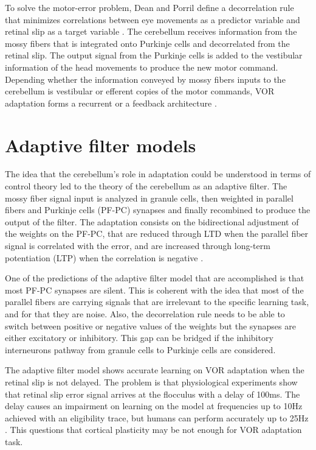 \documentclass[12pt, a4paper,twoside]{tesi_upf}
\begin{document}
\begin{appendices}
To solve the motor-error problem, Dean and Porril define a decorrelation rule that minimizes correlations between eye movements as a predictor variable and retinal slip as a target variable \cite{Dean2002}. The cerebellum receives information from the mossy fibers that is integrated onto Purkinje cells and decorrelated from the retinal slip. The output signal from the Purkinje cells is added to the vestibular information of the head movements to produce the new motor command. Depending whether the information conveyed by mossy fibers inputs to the cerebellum is vestibular or efferent copies of the motor commands, VOR adaptation forms a recurrent or a feedback architecture \cite{Porrill2004}.

\section{Adaptive filter models}

The idea that the cerebellum's role in adaptation could be understood in terms of control theory led to the theory of the cerebellum as an adaptive filter. The mossy fiber signal input is analyzed in granule cells, then weighted in parallel fibers and Purkinje cells (PF-PC) synapses and finally recombined to produce the output of the filter. The adaptation consists on the bidirectional adjustment of the weights on the PF-PC, that are reduced through LTD when the parallel fiber signal is correlated with the error, and are increased through long-term potentiation (LTP) when the correlation is negative \cite{Dean2010}.

One of the predictions of the adaptive filter model that are accomplished is that most PF-PC synapses are silent. This is coherent with the idea that most of the parallel fibers are carrying signals that are irrelevant to the specific learning task, and for that they are noise. Also, the decorrelation rule needs to be able to switch between positive or negative values of the weights but the synapses are either excitatory or inhibitory. This gap can be bridged if the inhibitory interneurons pathway from granule cells to Purkinje cells are considered.

The adaptive filter model shows accurate learning on VOR adaptation when the retinal slip is not delayed. The problem is that physiological experiments show that retinal slip error signal arrives at the flocculus with a delay of 100ms. The delay causes an impairment on learning on the model at frequencies up to 10Hz achieved with an eligibility trace, but humans can perform accurately up to 25Hz \cite{Porrill2007}. This questions that cortical plasticity may be not enough for VOR adaptation task.


\end{appendices}
\end{document}
